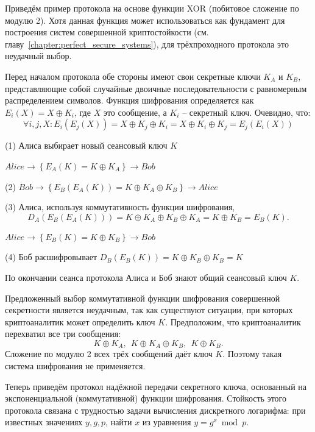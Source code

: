 Приведём пример протокола на основе функции XOR (побитовое сложение по модулю 2). Хотя данная функция может использоваться как фундамент для построения систем совершенной криптостойкости (см. главу~\ref{chapter:perfect_secure_systems}), для трёхпроходного протокола это неудачный выбор.

Перед началом протокола обе стороны имеют свои секретные ключи $K_A$ и $K_B$, представляющие собой случайные двоичные последовательности с равномерным распределением символов. Функция шифрования определяется как $E_i( X ) = X \oplus K_i$, где $X$ это сообщение, а $K_i$ -- секретный ключ. Очевидно, что:
\[ \forall i, j, X: E_i \left( E_j \left( X \right) \right) = X \oplus K_j \oplus K_i = X \oplus K_i \oplus K_j = E_j \left( E_i \left( X \right) \right) \]

\begin{protocol}
    \item[(1)] Алиса выбирает новый сеансовый ключ $K$
    \item[{}] $Alice \to \left\{ E_A \left( K \right) = K \oplus K_A \right\} \to Bob$
    \item[(2)] $Bob \to \left\{ E_B \left( E_A \left( K \right) \right) = K \oplus K_A \oplus K_B \right\} \to Alice$
    \item[(3)] Алиса, используя коммутативность функции шифрования,
	\[ D_A \left( E_B \left( E_A \left( K \right) \right) \right) = K \oplus K_A \oplus K_B \oplus K_A = K \oplus K_B = E_B \left( K \right). \]
    \item[{}] $Alice \to \left\{ E_B \left( K \right) = K \oplus K_B \right\} \to Bob$
    \item[(4)] Боб расшифровывает $D_B \left( E_B \left( K \right) \right) = K \oplus K_B \oplus K_B = K$
\end{protocol}

По окончании сеанса протокола Алиса и Боб знают общий сеансовый ключ $K$.

Предложенный выбор коммутативной функции шифрования совершенной секретности является неудачным, так как существуют ситуации, при которых криптоаналитик может определить ключ $K$. Предположим, что криптоаналитик перехватил все три сообщения:
    \[ K \oplus K_A, ~~ K \oplus K_A \oplus K_B, ~~ K \oplus K_B. \]
Сложение по модулю 2 всех трёх сообщений даёт ключ $K$. Поэтому такая система шифрования не применяется.

Теперь приведём протокол надёжной передачи секретного ключа, основанный на экспоненциальной (коммутативной) функции шифрования. Стойкость этого протокола связана с трудностью задачи вычисления дискретного логарифма: при известных значениях $y, g, p$, найти $x$ из уравнения $y = g^x \bmod p$.

